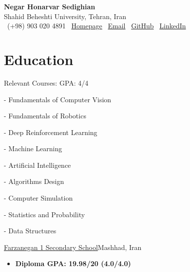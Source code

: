\documentclass[11pt,a4paper,sans]{moderncv}        %
\makeatletter
\newcommand{\header}{
    \begin{center}
        {\LARGE \textbf{\textcolor{headerblue}{Negar Honarvar Sedighian}}}\\[0.2cm]
        {\large Shahid Beheshti University, Tehran, Iran}\\[0.2cm]
        \faPhone\ (+98) 903 020 4891 \quad
        \faHome\ \href{https://negarhonarvar.github.io}{Homepage} \quad
        \faEnvelope\ \href{mailto:negarhonarvar.se@gmail.com}{Email} \quad
        \faGithub\ \href{https://github.com/negarhonarvar}{GitHub} \quad
        \faLinkedin\ \href{https://linkedin.com/in/negar-honarvar-sedighian}{LinkedIn}
    \end{center}
}
\makeatother
\begin{document}
\vspace*{-1.05mm}

\header
\vspace*{-10mm}
\section{Education}
\item{}

{}{Relevant Courses: GPA: 4/4}
\vspace{-1.0em}\begin{small}
 \begin{multicols}{3}
    \begin{itemize}
- Fundamentals of Computer Vision

- Fundamentals of Robotics

- Deep Reinforcement Learning 

- Machine Learning

- Artificial Intelligence

- Algorithms Design

- Computer Simulation

- Statistics and Probability 

- Data Structures 

    \end{itemize}
    \end{multicols}\end{small}
\item{
{\href{https://en.wikipedia.org/wiki/National_Organization_for_Development_of_Exceptional_Talents}{Farzanegan 1 Secondary School}}{Mashhad, Iran}{}{\vspace{3pt} 
\begin{itemize}
    \item \textbf{Diploma GPA: 19.98/20 (4.0/4.0)}
\end{itemize}
}}
\end{document}
